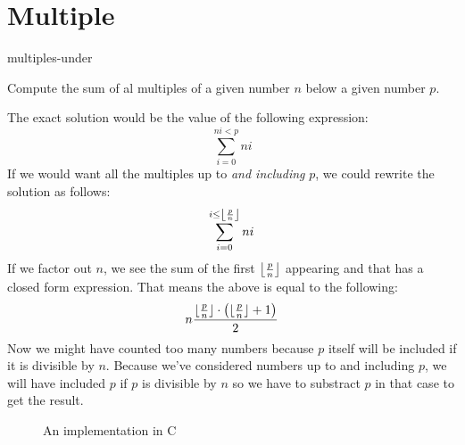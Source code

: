 \documentclass[main.tex]{subfiles}
\begin{document}
\chapter{Multiple}

\begin{libraryfile}
  \begin{algorithm}{1}{1}{multiples-under}
    \begin{algorithm-description}
        Compute the sum of al multiples of a given number $n$ below a given number $p$.
    \end{algorithm-description}
    \begin{algorithm-explanation}
      The exact solution would be the value of the following expression:
      \[ \sum_{i=0}^{ni < p}ni \]
      If we would want all the multiples up to \textit{and including} $p$, we could rewrite the solution as follows:
      \[ \sum_{i=0}^{i \le \floor*{\frac{p}{n}}}ni \]
      If we factor out $n$, we see the sum of the first $\floor*{\frac{p}{n}}$ appearing and that has a closed form expression.
      That means the above is equal to the following:
      \[ n\frac{\floor{\frac{p}{n}}\cdot \left(\floor{\frac{p}{n}} + 1\right)}{2} \]
      Now we might have counted too many numbers because $p$ itself will be included if it is divisible by $n$.
      Because we've considered numbers up to and including $p$, we will have included $p$ if $p$ is divisible by $n$ so we have to substract $p$ in that case to get the result.

      \begin{figure}[H]
        \centering
         {}
        \caption{An implementation in C}
      \end{figure}
    \end{algorithm-explanation}
  \end{algorithm}
\end{libraryfile}
\end{document}
